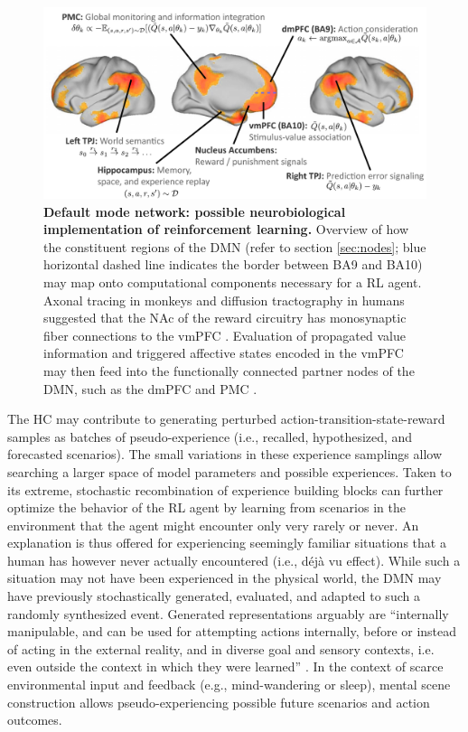 \documentclass[10pt,letterpaper]{article}
\begin{document}
  
\begin{figure}[!h]
  \includegraphics[width=.9\linewidth]{neurobiological_and_rl_overview_DMN.pdf}
  \caption{\textbf{Default mode network:
  possible neurobiological implementation of reinforcement learning.}
  Overview of how the constituent regions of the DMN (refer to section \ref{sec:nodes}; blue horizontal dashed line indicates the border between BA9 and BA10) may
  map onto computational components necessary for a RL agent.
  Axonal tracing in monkeys and diffusion tractography in humans suggested
  that the NAc of the reward circuitry has monosynaptic fiber connections
  to the vmPFC \citep{haber1995, croxson2005quantitative}. Evaluation of
  propagated value information and triggered affective states encoded
  in the vmPFC may then feed into the functionally connected partner nodes of
  the DMN, such as the dmPFC and PMC \citep{andrews2010, bzdok2013segregation}.
}
  \label{fig:rl_process_chart}
\end{figure}








The HC may contribute to generating
perturbed action-transition-state-reward samples
as batches of pseudo-experience
(i.e., recalled, hypothesized, and forecasted scenarios).
The small variations in these experience samplings allow searching
a larger space of model parameters and possible experiences.
Taken to its extreme, stochastic recombination of experience
building blocks can further optimize the behavior of the RL agent
by learning from scenarios in the environment that the agent might
encounter only very rarely or never.
An explanation is thus offered for experiencing seemingly familiar situations that
a human has however never actually encountered (i.e., d\'{e}j\`{a} vu effect).
While such a situation may not have been experienced in the physical world,
the DMN may have previously stochastically generated, evaluated, and adapted to
such a randomly synthesized event.
Generated representations arguably are ``internally manipulable,
and can be used for attempting actions internally,
before or instead of acting in the external reality,
and in diverse goal and sensory contexts, i.e. even outside the context in which they were learned''
\citep{pezzulo2011grounding}.
In the context of scarce environmental input and feedback
(e.g., mind-wandering or sleep),
mental scene construction allows pseudo-experiencing possible
future scenarios and action outcomes.
\end{document}
